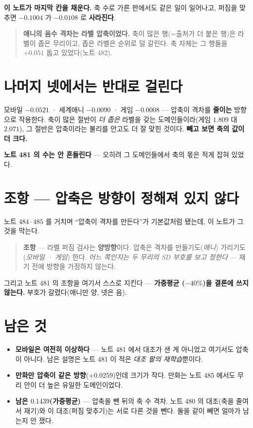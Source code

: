 \documentclass[11pt]{article}
\begin{document}
\textbf{이 노트가 마지막 칸을 채운다.} 축 수로 가른 판에서도 같은 일이
일어나고, 퍼짐을 맞추면 $-0.1004$ 가 $-0.0108$ 로 \textbf{사라진다}.

\begin{quote}
\textbf{애니의 음수 격차는 라벨 압축이었다.} 축이 많은 행(=출처가 더
붙은 행)은 라벨이 좁은 무리이고, 좁은 라벨은 순위로 덜 갈린다. 축 자체는
그 행들을 $+0.051$ 돕고 있었다(노트 482).
\end{quote}

\section{나머지 넷에서는 반대로 걸린다}

모바일 $-0.0521$ · 세계애니 $-0.0090$ · 게임 $-0.0008$ --- 압축이 격차를
\textbf{줄이는} 방향으로 작용한다. 축이 많은 절반이 \emph{더 좁은} 라벨을
갖는 도메인들이라(게임 $1.809$ 대 $2.071$), 그 절반은 압축이라는 불리를
안고도 더 잘 맞힌 것이다. \textbf{빼고 보면 축의 값이 더 크다.}

\textbf{노트 481 의 수는 안 흔들린다} --- 오히려 그 도메인들에서 축의
몫은 적게 잡혀 있었다.

\section*{조항 --- 압축은 방향이 정해져 있지 않다}

노트 $484 \cdot 485$ 를 거치며 ``압축이 격차를 만든다''가 기본값처럼
됐는데, 이 노트가 그것을 막는다.

\begin{quote}
\textbf{조항} --- 라벨 퍼짐 검사는 \textbf{양방향}이다. 압축은 격차를
만들기도(\emph{애니}) 가리기도(\emph{모바일 · 게임}) 한다. \emph{어느
쪽인지는 두 무리의 SD 부호를 보고 정한다} --- 재기 전에 방향을 가정하지
않는다.
\end{quote}

그리고 노트 481 의 조항을 여기서 스스로 지킨다 --- \textbf{가중평균
($-40\%$)을 결론에 쓰지 않는다.} 부호가 갈렸다(애니만 양, 넷은 음).

\section*{남은 것}

\begin{itemize}
\item \textbf{모바일은 여전히 이상하다} --- 노트 481 에서 대조가 샌 게
아니었고 여기서도 압축이 아니다. 남은 설명은 노트 481 이 적은 \emph{대조
팔의 재학습}뿐이다.
\item \textbf{만화만 압축이 같은 방향}($+0.0259$)인데 크기가 작다. 만화는
노트 485 에서도 무리 안이 더 높은 유일한 도메인이었다.
\item \textbf{남은 $0.1439$(가중평균)} --- 압축을 뺀 뒤의 축 수 격차.
노트 480 의 대조(축을 줄여서 재기)와 이 대조(퍼짐 맞추기)는 서로 다른
것을 뺀다. 둘을 같이 빼면 얼마가 남는지 안 쟀다.
\end{itemize}
\end{document}
